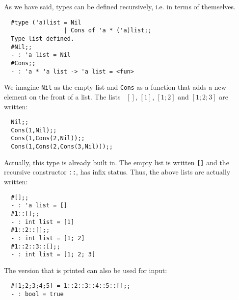 \begin{slide*}


\vspace*{0.5cm}

As we have said, types can be defined recursively, i.e. in terms of themselves.

\begin{black}\begin{verbatim}
  #type ('a)list = Nil
                 | Cons of 'a * ('a)list;;
  Type list defined.
  #Nil;;
  - : 'a list = Nil
  #Cons;;
  - : 'a * 'a list -> 'a list = <fun>
\end{verbatim}\end{black}

We imagine {\black \tt Nil} as the empty list and {\black \tt Cons} as a
function that adds a new element on the front of a list. The lists {\black \tt
$[]$}, {\black \tt $[1]$}, {\black \tt $[1;2]$} and {\black \tt $[1;2;3]$} are
written:

\begin{black}\begin{verbatim}
  Nil;;
  Cons(1,Nil);;
  Cons(1,Cons(2,Nil));;
  Cons(1,Cons(2,Cons(3,Nil)));;
\end{verbatim}\end{black}

\end{slide*}




\begin{slide*}


\vspace*{0.5cm}

Actually, this type is already built in. The empty list is written {\black \verb+[]+}
and the recursive constructor {\black \verb+::+}, has infix status. Thus, the above
lists are actually written:

\begin{black}\begin{verbatim}
  #[];;
  - : 'a list = []
  #1::[];;
  - : int list = [1]
  #1::2::[];;
  - : int list = [1; 2]
  #1::2::3::[];;
  - : int list = [1; 2; 3]
\end{verbatim}\end{black}

The version that is printed can also be used for input:

\begin{black}\begin{verbatim}
  #[1;2;3;4;5] = 1::2::3::4::5::[];;
  - : bool = true
\end{verbatim}\end{black}


\end{slide*}





